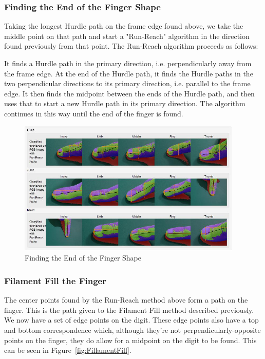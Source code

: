 \subsubsection{Finding the End of the Finger Shape}\label{sec:FindingTheEndOfTheFingerShape}
Taking the longest Hurdle path on the frame edge found above, we take the middle point on that path and start a "Run-Reach" algorithm in the direction found previously from that point. The Run-Reach algorithm proceeds as follows:

It finds a Hurdle path in the primary direction, i.e. perpendicularly away from the frame edge. At the end of the Hurdle path, it finds the Hurdle paths in the two perpendicular directions to its primary direction, i.e. parallel to the frame edge. It then finds the midpoint between the ends of the Hurdle path, and then uses that to start a new Hurdle path in its primary direction. The algorithm continues in this way until the end of the finger is found.

\begin{figure}[h!]
  \centering
    \includegraphics[width=0.95\textwidth]{Chapter4/Figs/FindingTheTip.jpg}
    \caption{Finding the End of the Finger Shape}\label{fig:FindingTheTip}
\end{figure}



\subsubsection{Filament Fill the Finger}\label{FilamentFillTheFinger}
The center points found by the Run-Reach method above form a path on the finger. This is the path given to the Filament Fill method described previously. We now have a set of edge points on the digit. These edge points also have a top and bottom correspondence which, although they're not perpendicularly-opposite points on the finger, they do allow for a midpoint on the digit to be found. This can be seen in Figure~\ref{fig:FillamentFill}.

